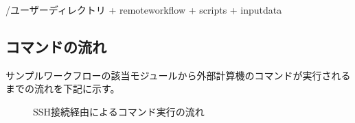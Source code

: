\documentclass[letterpaper,10pt,dvipdfmx,openany]{sphinxmanual}
\begin{document}
\begin{sphinxVerbatim}[commandchars=\\\{\}]
\PYGZti{}/ユーザーディレクトリ
  + remote\PYGZus{}workflow
    + scripts
      + input\PYGZus{}data
\end{sphinxVerbatim}


\subsection{コマンドの流れ}
\label{\detokenize{using_distributed_properties:id11}}
サンプルワークフローの該当モジュールから外部計算機のコマンドが実行されるまでの流れを下記に示す。

\begin{figure}[htbp]
\centering
\capstart

\caption{SSH接続経由によるコマンド実行の流れ}\label{\detokenize{using_distributed_properties:id45}}\end{figure}
\end{document}
